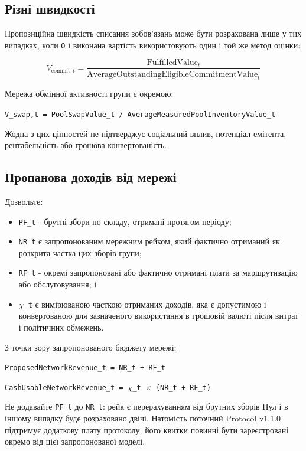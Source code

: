 \documentclass[11pt]{article}
\begin{document}
\subsection*{Різні швидкості}

Пропозиційна швидкість списання зобов'язань може бути розрахована лише у тих випадках, коли \texttt{O} і виконана вартість використовують один і той же метод оцінки:

\[
V_{\mathrm{commit},t} = \frac{\mathrm{FulfilledValue}_t}{\mathrm{AverageOutstandingEligibleCommitmentValue}_t}
\]

Мережа обмінної активності групи є окремою:

\texttt{V\_swap,t = PoolSwapValue\_t / AverageMeasuredPoolInventoryValue\_t}

Жодна з цих цінностей не підтверджує соціальний вплив, потенціал емітента, рентабельність або грошова конвертованість.

\subsection*{Пропанова доходів від мережі}

Дозвольте:

\begin{itemize}[leftmargin=*]
\item \texttt{PF\_t} - брутні збори по складу, отримані протягом періоду;
\item \texttt{NR\_t} є запропонованим мережним рейком, який фактично отриманий як розкрита частка цих зборів групи;
\item \texttt{RF\_t} - окремі запропоновані або фактично отримані плати за маршрутизацію або обслуговування; і
\item \texttt{$\chi$\_t} є вимірюваною часткою отриманих доходів, яка є допустимою і конвертованою для зазначеного використання в грошовій валюті після витрат і політичних обмежень.
\end{itemize}
З точки зору запропонованого бюджету мережі:

\texttt{ProposedNetworkRevenue\_t = NR\_t + RF\_t}

\texttt{CashUsableNetworkRevenue\_t = $\chi$\_t $\times$ (NR\_t + RF\_t)}

Не додавайте \texttt{PF\_t} до \texttt{NR\_t}: рейк є перерахуванням від брутних зборів Пул і в іншому випадку буде розраховано двічі. Натомість поточний Protocol v1.1.0 підтримує додаткову плату протоколу; його квитки повинні бути зареєстровані окремо від цієї запропонованої моделі.
\end{document}
